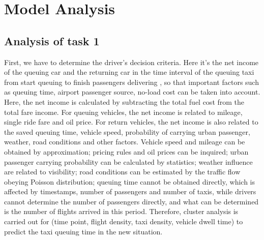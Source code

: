 \section{Model Analysis}
\subsection{Analysis of task 1}

\par First, we have to determine the driver's decision criteria. Here it's the net income of the queuing car and the returning car in the time interval of the queuing taxi from start queuing to finish passengers delivering , so that important factors such as queuing time, airport passenger source, no-load cost can be taken into account. Here, the net income is calculated by subtracting the total fuel cost from the total fare income. For queuing vehicles, the net income is related to mileage, single ride fare and oil price. For return vehicles, the net income is also related to the saved queuing time, vehicle speed, probability of carrying urban passenger, weather, road conditions and other factors. Vehicle speed and mileage can be obtained by approximation; pricing rules and oil prices can be inquired; urban passenger carrying probability can be calculated by statistics; weather influence are related to visibility; road conditions can be estimated by the traffic flow obeying Poisson distribution; queuing time cannot be obtained directly, which is affected by timestamps, number of passengers and number of taxis, while drivers cannot determine the number of passengers directly, and what can be determined is the number of flights arrived in this period. Therefore, cluster analysis is carried out for (time point, flight density, taxi density, vehicle dwell time) to predict the taxi queuing time in the new situation.

